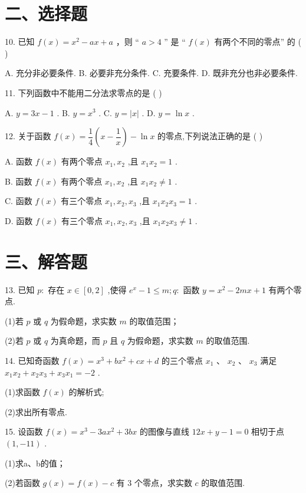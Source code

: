 \section*{二、选择题}

10. 已知 $f\left( x\right)  = {x}^{2} - {ax} + a$ ，则 “ $a > 4$ ” 是 “ $f\left( x\right)$ 有两个不同的零点” 的 ( )

A. 充分非必要条件. B. 必要非充分条件. C. 充要条件. D. 既非充分也非必要条件.

11. 下列函数中不能用二分法求零点的是 ( )

A. $y = {3x} - 1$ . B. $y = {x}^{3}$ . C. $y = \left| x\right|$ . D. $y = \ln x$ .

12. 关于函数 $f\left( x\right)  = \dfrac{1}{4}\left( {x - \dfrac{1}{x}}\right)  - \ln x$ 的零点,下列说法正确的是 ( )

A. 函数 $f\left( x\right)$ 有两个零点 ${x}_{1},{x}_{2}$ ,且 ${x}_{1}{x}_{2} = 1$ .

B. 函数 $f\left( x\right)$ 有两个零点 ${x}_{1},{x}_{2}$ ,且 ${x}_{1}{x}_{2} \neq  1$ .

C. 函数 $f\left( x\right)$ 有三个零点 ${x}_{1},{x}_{2},{x}_{3}$ ,且 ${x}_{1}{x}_{2}{x}_{3} = 1$ .

D. 函数 $f\left( x\right)$ 有三个零点 ${x}_{1},{x}_{2},{x}_{3}$ ,且 ${x}_{1}{x}_{2}{x}_{3} \neq  1$ .

\section*{三、解答题}

13. 已知 $p :$ 存在 $x \in  \left\lbrack  {0,2}\right\rbrack$ ,使得 ${{e}}^{x} - 1 \leq  m;q :$ 函数 $y = {x}^{2} - {2mx} + 1$ 有两个零点.

(1)若 $p$ 或 $q$ 为假命题，求实数 $m$ 的取值范围；

(2)若 $p$ 或 $q$ 为真命题，而 $p$ 且 $q$ 为假命题，求实数 $m$ 的取值范围.

14. 已知奇函数 $f\left( x\right)  = {x}^{3} + b{x}^{2} + {cx} + d$ 的三个零点 ${x}_{1}$ 、 ${x}_{2}$ 、 ${x}_{3}$ 满足 ${x}_{1}{x}_{2} + {x}_{2}{x}_{3} + {x}_{3}{x}_{1} =  - 2$ .

(1)求函数 $f\left( x\right)$ 的解析式;

(2)求出所有零点.


15. 设函数 $f\left( x\right)  = {x}^{3} - {3a}{x}^{2} + {3bx}$ 的图像与直线 ${12x} + y - 1 = 0$ 相切于点 $\left( {1, - {11}}\right)$ .

(1)求a、b的值；

(2)若函数 $g\left( x\right)  = f\left( x\right)  - c$ 有 3 个零点，求实数 $c$ 的取值范围.

